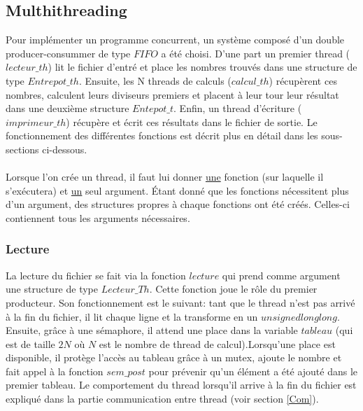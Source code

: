 \documentclass{article}
\begin{document}
\subsection{Multhithreading}
Pour implémenter un programme concurrent, un système composé d'un double producer-consummer de type $FIFO$ a été choisi. D'une part un premier thread ($lecteur\_th$) lit le fichier d'entré et place les nombres trouvés dans une structure de type $Entrepot\_th$. Ensuite, les N threads de calculs ($calcul\_th$) récupèrent ces nombres, calculent leurs diviseurs premiers et placent à leur tour leur résultat dans une deuxième structure $Entepot\_t$. Enfin, un thread d'écriture ($imprimeur\_th$) récupère et écrit ces résultats dans le fichier de sortie. Le fonctionnement des différentes fonctions est décrit plus en détail dans les sous-sections ci-dessous.\\ 
\\ \danger Lorsque l'on crée un thread, il faut lui donner \underline{une} fonction (sur laquelle il s'exécutera) et \underline{un} seul argument. Étant donné que les fonctions nécessitent plus d'un argument, des structures propres à chaque fonctions ont été créés. Celles-ci contiennent tous les arguments nécessaires.

\subsubsection{Lecture}
La lecture du fichier se fait via la fonction $lecture$ qui prend comme argument une structure de type $Lecteur\_Th$. Cette fonction joue le rôle du premier producteur. Son fonctionnement est le suivant: tant que le thread n'est pas arrivé à la fin du fichier, il lit chaque ligne et la transforme en un $unsigned long long$. Ensuite, grâce à une sémaphore, il attend une place dans la variable $tableau$ (qui est de taille $2N$ où $N$ est le nombre de thread de calcul).Lorsqu'une place est disponible, il protège l'accès au tableau grâce à un mutex, ajoute le nombre et fait appel à la fonction $sem\_post$ pour prévenir qu'un élément a été ajouté dans le premier tableau.
Le comportement du thread lorsqu'il arrive à la fin du fichier est expliqué dans la partie communication entre thread (voir section \ref{Com}).
\end{document}
